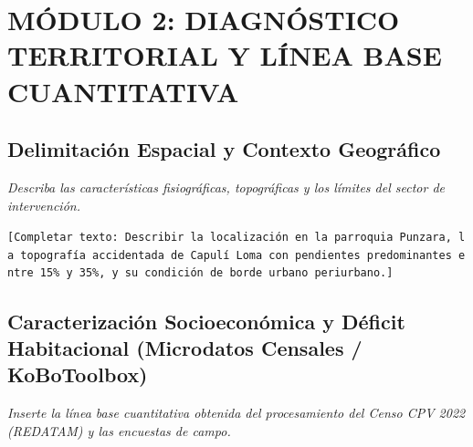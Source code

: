 \documentclass[
  letterpaper,
  DIV=11,
  numbers=noendperiod]{scrreprt}
\begin{document}
\chapter{MÓDULO 2: DIAGNÓSTICO TERRITORIAL Y LÍNEA BASE
CUANTITATIVA}\label{muxf3dulo-2-diagnuxf3stico-territorial-y-luxednea-base-cuantitativa}

\section{Delimitación Espacial y Contexto
Geográfico}\label{delimitaciuxf3n-espacial-y-contexto-geogruxe1fico}

\emph{Describa las características fisiográficas, topográficas y los
límites del sector de intervención.}

\texttt{{[}Completar\ texto:\ Describir\ la\ localización\ en\ la\ parroquia\ Punzara,\ la\ topografía\ accidentada\ de\ Capulí\ Loma\ con\ pendientes\ predominantes\ entre\ 15\%\ y\ 35\%,\ y\ su\ condición\ de\ borde\ urbano\ periurbano.{]}}

\section{Caracterización Socioeconómica y Déficit Habitacional
(Microdatos Censales /
KoBoToolbox)}\label{caracterizaciuxf3n-socioeconuxf3mica-y-duxe9ficit-habitacional-microdatos-censales-kobotoolbox}

\emph{Inserte la línea base cuantitativa obtenida del procesamiento del
Censo CPV 2022 (REDATAM) y las encuestas de campo.}
\end{document}
